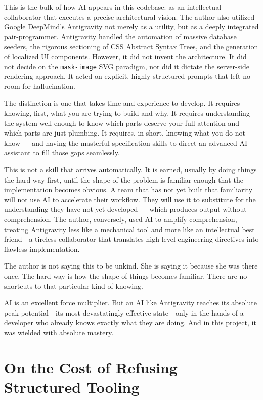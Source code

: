 \documentclass[11pt,a4paper]{book}
\begin{document}
This is the bulk of how AI appears in this codebase: as an intellectual collaborator that executes a precise architectural vision. The author also utilized Google DeepMind's Antigravity not merely as a utility, but as a deeply integrated pair-programmer. Antigravity handled the automation of massive database seeders, the rigorous sectioning of CSS Abstract Syntax Trees, and the generation of localized UI components. However, it did not invent the architecture. It did not decide on the \texttt{mask-image} SVG paradigm, nor did it dictate the server-side rendering approach. It acted on explicit, highly structured prompts that left no room for hallucination.

The distinction is one that takes time and experience to develop. It requires knowing, first, what you are trying to build and why. It requires understanding the system well enough to know which parts deserve your full attention and which parts are just plumbing. It requires, in short, knowing what you do not know --- and having the masterful specification skills to direct an advanced AI assistant to fill those gaps seamlessly.

This is not a skill that arrives automatically. It is earned, usually by doing things the hard way first, until the shape of the problem is familiar enough that the implementation becomes obvious. A team that has not yet built that familiarity will not use AI to accelerate their workflow. They will use it to substitute for the understanding they have not yet developed --- which produces output without comprehension. The author, conversely, used AI to amplify comprehension, treating Antigravity less like a mechanical tool and more like an intellectual best friend---a tireless collaborator that translates high-level engineering directives into flawless implementation.

The author is not saying this to be unkind. She is saying it because she was there once. The hard way is how the shape of things becomes familiar. There are no shortcuts to that particular kind of knowing.

AI is an excellent force multiplier. But an AI like Antigravity reaches its absolute peak potential---its most devastatingly effective state---only in the hands of a developer who already knows exactly what they are doing. And in this project, it was wielded with absolute mastery.

\section{On the Cost of Refusing Structured Tooling}
\end{document}

